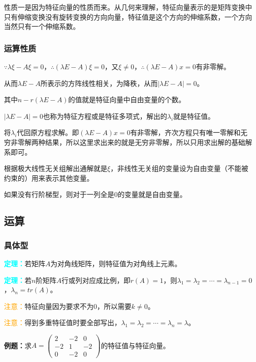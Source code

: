 \documentclass[UTF8, 12pt]{ctexart}
\begin{document}
性质一是因为特征向量的性质而来。从几何来理解，特征向量表示的是矩阵变换中只有伸缩变换没有旋转变换的方向向量，特征值是这个方向的伸缩系数，一个方向当然只有一个伸缩系数。

\subsubsection{运算性质}

$\because\lambda\xi-A\xi=0$，$\therefore(\lambda E-A)\xi=0$，又$\xi\neq0$，$\therefore(\lambda E-A)x=0$有非零解。

从而$\lambda E-A$所表示的方阵线性相关，为降秩，从而$\vert\lambda E-A\vert=0$。

其中$n-r(\lambda E-A)$的值就是特征向量中自由变量的个数。

$\vert\lambda E-A\vert=0$也称为特征方程或是特征多项式，解出的$\lambda_i$就是特征值。

将$\lambda_i$代回原方程求解。即$(\lambda E-A)x=0$有非零解，齐次方程只有唯一零解和无穷非零解两种结果，所以这里求出来的就是无穷非零解，所以只用求出解的基础解系即可。

根据极大线性无关组解出通解就是$\xi$，非线性无关组的变量设为自由变量（不能被约束的）用来表示其他变量。

如果没有行阶梯型，则对于一列全是0的变量就是自由变量。

\subsection{运算}

\subsubsection{具体型}

\textcolor{aqua}{\textbf{定理：}}若矩阵$A$为对角线矩阵，则特征值为对角线上元素。

\textcolor{aqua}{\textbf{定理：}}若$n$阶矩阵$A$行或列对应成比例，即$r(A)=1$，则$\lambda_1=\lambda_2=\cdots=\lambda_{n-1}=0$，$\lambda_n=tr(A)$。

\textcolor{orange}{注意：}特征向量因为要求不为0，所以需要$k\neq0$。

\textcolor{orange}{注意：}得到多重特征值时要全部写出，$\lambda_1=\lambda_2=\cdots=\lambda_n=\lambda$。

\textbf{例题：}求$A=\left(\begin{array}{ccc}
2 & -2 & 0 \\
-2 & 1 & -2 \\
0 & -2 & 0
\end{array}\right)$的特征值与特征向量。
\end{document}

